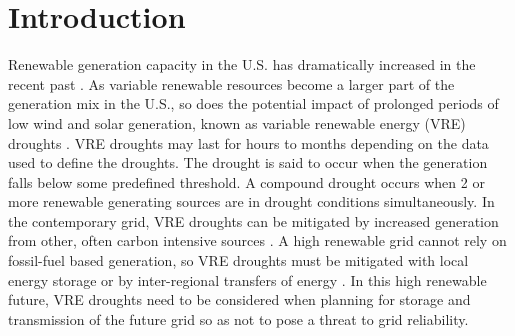 \documentclass{agujournal2019}
\begin{document}

%
%
%
%


\section{Introduction}


Renewable generation capacity in the U.S. has dramatically increased in the recent past \cite{Browning_2023,Ou2023,Ou2024}. As variable renewable resources become a larger part of the generation mix in the U.S., so does the potential impact of prolonged periods of low wind and solar generation, known as variable renewable energy (VRE) droughts \cite{Bracken2024}. VRE droughts may last for hours to months depending on the data used to define the droughts. The drought is said to occur when the generation falls below some predefined threshold. A compound drought occurs when 2 or more renewable generating sources are in drought conditions simultaneously. In the contemporary grid, VRE droughts can be mitigated by increased generation from other, often carbon intensive sources \cite{van_der_Wiel_2019a,Raynaud2018,Rife2016}. A high renewable grid cannot rely on fossil-fuel based generation, so VRE droughts must be mitigated with local energy storage or by inter-regional transfers of energy \cite{Dyreson2022,Doering2023}. In this high renewable future, VRE droughts need to be considered when planning for storage and transmission of the future grid so as not to pose a threat to grid reliability. 
\end{document}
